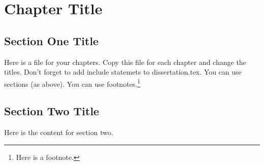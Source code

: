 
\chapter{Chapter Title}
\resetfootnote %

\section{Section One Title}

Here is a file for your chapters.  Copy this file for each chapter 
and change the titles.  Don't forget to add include statemets to 
dissertation.tex.  
You can use sections (as above).  
You can use footnotes.\footnote{Here is a footnote.}

\section{Section Two Title}

Here is the content for section two.
